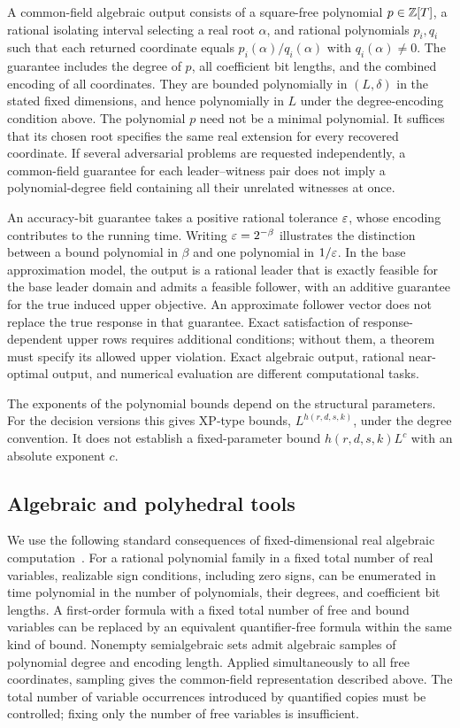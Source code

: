 A common-field algebraic output consists of a square-free polynomial
$p\in\mathbb Z[T]$, a rational isolating interval selecting a real root
$\alpha$, and rational polynomials $p_i,q_i$ such that each returned
coordinate equals $p_i(\alpha)/q_i(\alpha)$ with $q_i(\alpha)\ne0$.
The guarantee includes the degree of $p$, all coefficient bit lengths,
and the combined encoding of all coordinates. They are bounded
polynomially in $(L,\delta)$ in the stated fixed dimensions, and hence
polynomially in $L$ under the degree-encoding condition above. The
polynomial $p$ need not be a minimal polynomial. It suffices that its
chosen root specifies the same real extension for every recovered
coordinate. If several adversarial problems are requested independently,
a common-field guarantee for each leader--witness pair does not imply a
polynomial-degree field containing all their unrelated witnesses at once.

An accuracy-bit guarantee takes a positive rational tolerance $\varepsilon$,
whose encoding contributes to the running time. Writing $\varepsilon=2^{-\beta}$
illustrates the distinction between a bound polynomial in $\beta$ and
one polynomial in $1/\varepsilon$. In the base approximation model, the output
is a rational leader that is exactly feasible for the base leader domain
and admits a feasible follower, with an additive guarantee for the true
induced upper objective. An approximate follower vector does not replace
the true response in that guarantee. Exact satisfaction of
response-dependent upper rows requires additional conditions; without
them, a theorem must specify its allowed upper violation. Exact
algebraic output, rational near-optimal output, and numerical evaluation
are different computational tasks.

The exponents of the polynomial bounds depend on the structural
parameters. For the decision versions this gives XP-type bounds,
$L^{h(r,d,s,k)}$, under the degree convention. It does not establish a
fixed-parameter bound $h(r,d,s,k)L^c$ with an absolute exponent $c$.

\subsection{Algebraic and polyhedral tools}\label{subsec:tools}

We use the following standard consequences of fixed-dimensional real
algebraic computation~\cite[Theorem 1.3.1 and Section 3.1.3]{BasuPollackRoy1996}.
For a rational polynomial family in a fixed total number of real
variables, realizable sign conditions, including zero signs, can be
enumerated in time polynomial in the number of polynomials, their degrees,
and coefficient bit lengths. A first-order formula with a fixed total
number of free and bound variables can be replaced by an equivalent
quantifier-free formula within the same kind of bound. Nonempty
semialgebraic sets admit algebraic samples of polynomial degree and
encoding length. Applied simultaneously to all free coordinates, sampling
gives the common-field representation described above. The total number
of variable occurrences introduced by quantified copies must be controlled;
fixing only the number of free variables is insufficient.

